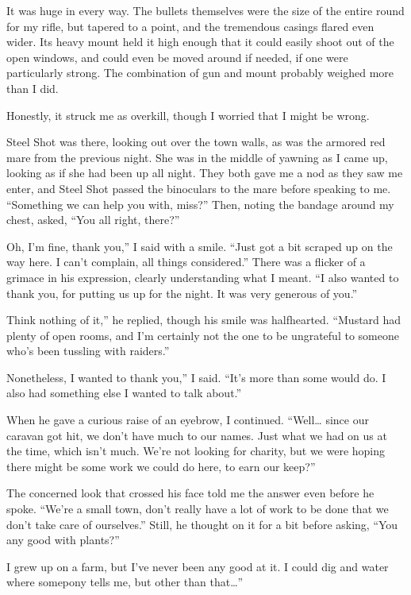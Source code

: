 It was huge in every way. The bullets themselves were the size of the entire round for my rifle, but tapered to a point, and the tremendous casings flared even wider. Its heavy mount held it high enough that it could easily shoot out of the open windows, and could even be moved around if needed, if one were particularly strong. The combination of gun and mount probably weighed more than I did.

Honestly, it struck me as overkill, though I worried that I might be wrong.

Steel Shot was there, looking out over the town walls, as was the armored red mare from the previous night. She was in the middle of yawning as I came up, looking as if she had been up all night. They both gave me a nod as they saw me enter, and Steel Shot passed the binoculars to the mare before speaking to me. “Something we can help you with, miss?” Then, noting the bandage around my chest, asked, “You all right, there?”

\leavevmode{}Oh, I’m fine, thank you,” I said with a smile. “Just got a bit scraped up on the way here. I can’t complain, all things considered.” There was a flicker of a grimace in his expression, clearly understanding what I meant. “I also wanted to thank you, for putting us up for the night. It was very generous of you.”

\leavevmode{}Think nothing of it,” he replied, though his smile was halfhearted. “Mustard had plenty of open rooms, and I’m certainly not the one to be ungrateful to someone who’s been tussling with raiders.”

\leavevmode{}Nonetheless, I wanted to thank you,” I said. “It’s more than some would do. I also had something else I wanted to talk about.”

When he gave a curious raise of an eyebrow, I continued. “Well… since our caravan got hit, we don’t have much to our names. Just what we had on us at the time, which isn’t much. We’re not looking for charity, but we were hoping there might be some work we could do here, to earn our keep?”

The concerned look that crossed his face told me the answer even before he spoke. “We’re a small town, don’t really have a lot of work to be done that we don’t take care of ourselves.” Still, he thought on it for a bit before asking, “You any good with plants?”

\leavevmode{}I grew up on a farm, but I’ve never been any good at it. I could dig and water where somepony tells me, but other than that…”

